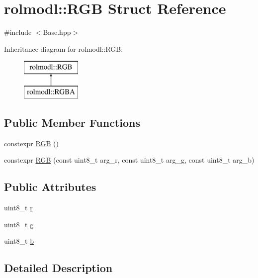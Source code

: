 \hypertarget{structrolmodl_1_1_r_g_b}{}\section{rolmodl\+::R\+GB Struct Reference}
\label{structrolmodl_1_1_r_g_b}


{\ttfamily \#include $<$Base.\+hpp$>$}

Inheritance diagram for rolmodl\+::R\+GB\+:\begin{figure}[H]
\begin{center}
\leavevmode
\includegraphics[height=2.000000cm]{structrolmodl_1_1_r_g_b}
\end{center}
\end{figure}
\subsection*{Public Member Functions}
\begin{DoxyCompactItemize}
\item 
constexpr \mbox{\hyperlink{structrolmodl_1_1_r_g_b_a8bb4c60c447cdf7bbac5c6379ec54359}{R\+GB}} ()
\item 
constexpr \mbox{\hyperlink{structrolmodl_1_1_r_g_b_a9f2fdf965d5e0a9a720babd959cd5c25}{R\+GB}} (const uint8\+\_\+t arg\+\_\+r, const uint8\+\_\+t arg\+\_\+g, const uint8\+\_\+t arg\+\_\+b)
\end{DoxyCompactItemize}
\subsection*{Public Attributes}
\begin{DoxyCompactItemize}
\item 
uint8\+\_\+t \mbox{\hyperlink{structrolmodl_1_1_r_g_b_a188c62cc17e0f6739c10e4d5ce6ae785}{r}}
\item 
uint8\+\_\+t \mbox{\hyperlink{structrolmodl_1_1_r_g_b_ad1916c33b016a51d1af7b181a269ed6c}{g}}
\item 
uint8\+\_\+t \mbox{\hyperlink{structrolmodl_1_1_r_g_b_a7e7991be3e9e5a49388c0c811dbb66e3}{b}}
\end{DoxyCompactItemize}


\subsection{Detailed Description}


